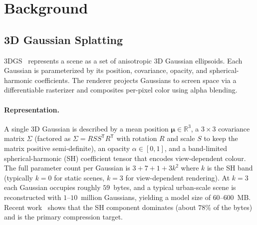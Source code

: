 
\section{Background}
\label{sec:background}

\subsection{3D Gaussian Splatting}
3DGS~\cite{kerbl20233dgs} represents a scene as a set of anisotropic
3D Gaussian ellipsoids. Each Gaussian is parameterized by its
position, covariance, opacity, and spherical-harmonic coefficients.
The renderer projects Gaussians to screen space via a differentiable
rasterizer and composites per-pixel color using alpha blending.

\paragraph{Representation.}
A single 3D Gaussian is described by a mean position
$\boldsymbol{\mu} \in \mathbb{R}^{3}$, a $3 \times 3$ covariance
matrix $\Sigma$ (factored as $\Sigma = R S S^{\mathsf{T}} R^{\mathsf{T}}$
with rotation $R$ and scale $S$ to keep the matrix positive
semi-definite), an opacity $\alpha \in [0, 1]$, and a band-limited
spherical-harmonic (SH) coefficient tensor that encodes
view-dependent colour. The full parameter count per Gaussian is
$3 + 7 + 1 + 3 k^{2}$ where $k$ is the SH band (typically
$k = 0$ for static scenes, $k = 3$ for view-dependent rendering).
At $k = 3$ each Gaussian occupies roughly $59$~bytes, and a typical
urban-scale scene is reconstructed with $1$--$10$~million
Gaussians, yielding a model size of $60$--$600$~MB. Recent
work~\cite{yu2024mipsplatting, fan2023lightgaussian, chen2024hacpp}
shows that the SH component dominates (about $78\%$ of the bytes)
and is the primary compression target.

